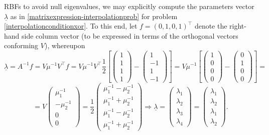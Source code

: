 \documentclass[12pt]{report} %
\begin{document}
RBFs to avoid null eigenvalues, we may explicitly compute the parameters
vector $\underline{\lambda}$ as in \eqref{matrixexpression-interpolationprob}
for problem \eqref{interpolationconditionxor}. To this end, let $f = (0, 1, 0,
1)^{\top}$ denote the right-hand side column vector (to be expressed in terms of the orthogonal vectors conforming $V$), whereupon
\[ \underline{\lambda} = A^{- 1} f = V \mu^{- 1} V^{\top} f = V \mu^{- 1}
   V^{\top} \frac{1}{2} \left[ \left(\begin{array}{c}
     1\\
     1\\
     1\\
     1
   \end{array}\right) - \left(\begin{array}{r}
     1\\
     - 1\\
     1\\
     - 1
   \end{array}\right) \right] = V \mu^{- 1} \left[ \left(\begin{array}{c}
     1\\
     0\\
     0\\
     0
   \end{array}\right) - \left(\begin{array}{c}
     0\\
     1\\
     0\\
     0
   \end{array}\right) \right] = \]
\[ = V \left(\begin{array}{r}
     \mu_1^{- 1}\\
     - \mu_2^{- 1}\\
     0\\
     0
   \end{array}\right) = \frac{1}{2} \left(\begin{array}{c}
     \mu_1^{- 1} - \mu_2^{- 1}\\
     \mu_1^{- 1} + \mu_2^{- 1}\\
     \mu_1^{- 1} - \mu_2^{- 1}\\
     \mu_1^{- 1} + \mu_2^{- 1}
   \end{array}\right) \Rightarrow \underline{\lambda} = \left(\begin{array}{c}
     \lambda_1\\
     \lambda_2\\
     \lambda_3\\
     \lambda_4
   \end{array}\right) = \left(\begin{array}{c}
     \lambda_1\\
     \lambda_2\\
     \lambda_1\\
     \lambda_2
   \end{array}\right) . \]
\end{document}
